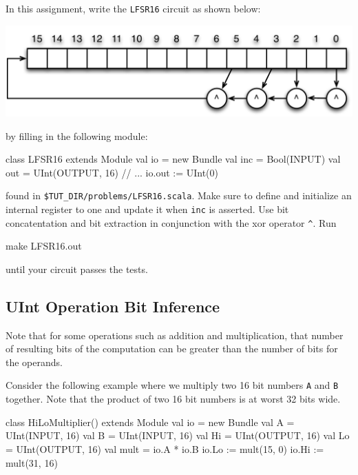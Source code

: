 \subsection{}

In this assignment, write the \verb+LFSR16+ circuit as shown below:

\begin{center}
\includegraphics[width=0.9\columnwidth]{../bootcamp/figs/LFSR16.pdf}
\end{center}

\noindent
by filling in the following module:

\begin{scala}
class LFSR16 extends Module {
  val io = new Bundle {
    val inc = Bool(INPUT)
    val out = UInt(OUTPUT, 16)
  }
  // ...
  io.out := UInt(0)
}
\end{scala}

\noindent
found in \verb+$TUT_DIR/problems/LFSR16.scala+.
Make sure to define and initialize an internal register to one and 
update it when \verb+inc+ is asserted.
Use bit concatentation and bit extraction 
in conjunction with the xor operator \verb+^+.  Run 

\begin{bash}
make LFSR16.out
\end{bash}

\noindent 
until your circuit passes the tests.

\subsection{UInt Operation Bit Inference}

Note that for some operations such as addition and multiplication, that number of resulting bits of the computation can be greater than the number of bits for the operands. 

Consider the following example where we multiply two 16 bit numbers \verb+A+ and \verb+B+ together. Note that the product of two 16 bit numbers is at worst 32 bits wide.

\begin{scala}
class HiLoMultiplier() extends Module {
  val io = new Bundle {
    val A  = UInt(INPUT, 16)
    val B  = UInt(INPUT, 16)
    val Hi = UInt(OUTPUT, 16)
    val Lo = UInt(OUTPUT, 16)
  }
  val mult = io.A * io.B
  io.Lo := mult(15, 0)
  io.Hi := mult(31, 16)  
}

\end{scala}

